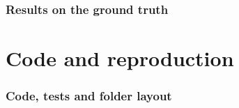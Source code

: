 \documentclass[11pt,a4paper]{article}
\begin{document}
\section{Results on the ground truth}\label{sec:results}












\part{Code and reproduction}

\section{Code, tests and folder layout}
\end{document}
